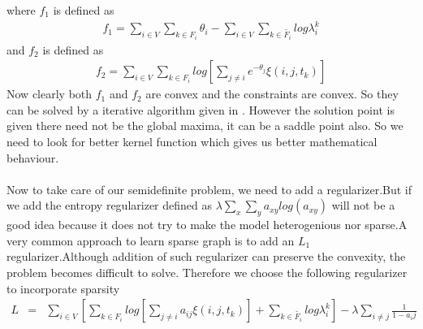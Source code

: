 where $f_1$ is defined as 
\begin{eqnarray*}
f_1 = \displaystyle\sum_{i \in V}\displaystyle\sum_{k \in F_i}\theta_i-\displaystyle\sum_{i \in V}\displaystyle\sum_{k \in \widetilde{F_{i}}}log\lambda_{i}^{k}
\end{eqnarray*}
and $f_2$ is defined as
\begin{eqnarray*}
f_2 = \displaystyle\sum_{i \in V}\displaystyle\sum_{k \in F_i}log[\displaystyle\sum_{j \neq i} e^{-\theta_j}\xi (i,j,t_k)]
\end{eqnarray*}
Now clearly both $f_1$ and $f_2$ are convex and the constraints are convex. So they can be solved by a iterative algorithm given in \cite{cccp}. However the solution point is given there need not be the global maxima, it can be a saddle point also. So we need to look for better kernel function which gives us better mathematical behaviour.
\\
\\ Now to take care of our semidefinite problem, we need to add a regularizer.But if we add the entropy regularizer defined as $\lambda \displaystyle\sum_x \displaystyle\sum_y a_{xy}log(a_{xy})$ will not be a good idea because it does not try to make the model heterogenious nor sparse.A very common approach to learn sparse graph is to add an $L_1$ regularizer.Although addition of such regularizer can preserve the convexity, the problem becomes difficult to solve. Therefore we choose the following regularizer to incorporate sparsity
\begin{eqnarray*}
L &=& \displaystyle\sum_{i \in V}[\displaystyle\sum_{k \in F_i}log[\displaystyle\sum_{j \neq i} a_{ij}\xi (i,j,t_k)]+\displaystyle\sum_{k \in \widetilde{F_{i}}}log\lambda_{i}^{k}] - \lambda \displaystyle\sum_{i \neq j} \frac{1}{1 - a_ij}
\end{eqnarray*}